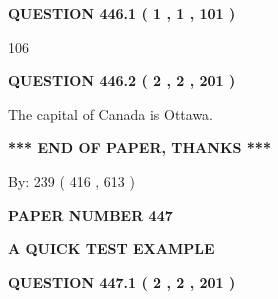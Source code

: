\documentclass[12pt]{article}
\begin{document}
{\textbf{\Large{QUESTION
446.1 
 ( 1 , 1 , 101 )
}}}
  
  
 
 
\noindent{}

106
 
 
  
\vspace{0.2in}
  
{\textbf{\Large{QUESTION
446.2 
 ( 2 , 2 , 201 )
}}}
  
  
 
 
\noindent{}
 
 
The capital of Canada is Ottawa.
 
 
 
 
   
   
 \vspace{0.2in}
 
   
   
   
   
\vspace{1.0in} 
{\textbf{\large{ *** END OF PAPER, THANKS *** }}} 
   
   
\hspace{1.0in} By: 
 239 ( 416 ,  613 )
   
   
   
   
\newpage 
\setcounter{page}{ 
   447001 } 
   
   
   
   
 {\textbf{ \Large{ PAPER NUMBER  447  }}}
   
   
\vspace{0.2in}
   
   
   
   
   
   
 \vspace{0.2in}
{\LARGE {\textbf{ A QUICK TEST EXAMPLE}}}
   
   
  
\vspace{0.2in}
  
{\textbf{\Large{QUESTION
447.1 
 ( 2 , 2 , 201 )
}}}
  
  
 
 
\noindent{}
 
\end{document}
